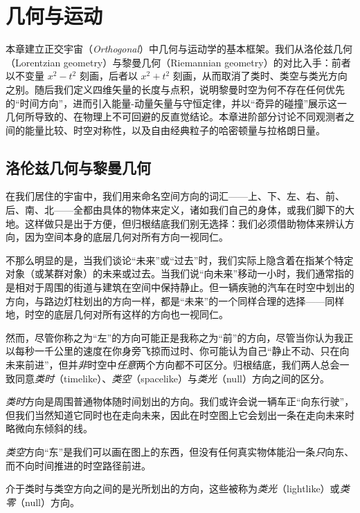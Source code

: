 \chapter{几何与运动}

本章建立正交宇宙（\emph{Orthogonal}）中几何与运动学的基本框架。我们从洛伦兹几何（Lorentzian geometry）与黎曼几何（Riemannian geometry）的对比入手：前者以不变量 $x^{2}-t^{2}$ 刻画，后者以 $x^{2}+t^{2}$ 刻画，从而取消了类时、类空与类光方向之别。随后我们定义四维矢量的长度与点积，说明黎曼时空为何不存在任何优先的“时间方向”，进而引入能量-动量矢量与守恒定律，并以“奇异的碰撞”展示这一几何所导致的、在物理上不可回避的反直觉结论。本章进阶部分讨论不同观测者之间的能量比较、时空对称性，以及自由经典粒子的哈密顿量与拉格朗日量。

\section{洛伦兹几何与黎曼几何}

在我们居住的宇宙中，我们用来命名空间方向的词汇——上、下、左、右、前、后、南、北——全都由具体的物体来定义，诸如我们自己的身体，或我们脚下的大地。这样做只是出于方便，但归根结底我们别无选择：我们必须借助物体来辨认方向，因为空间本身的底层几何对所有方向一视同仁。

不那么明显的是，当我们谈论“未来”或“过去”时，我们实际上隐含着在指某个特定对象（或某群对象）的未来或过去。当我们说“向未来”移动一小时，我们通常指的是相对于周围的街道与建筑在空间中保持静止。但一辆疾驰的汽车在时空中划出的方向，与路边灯柱划出的方向一样，都是“未来”的一个同样合理的选择——同样地，时空的底层几何对所有这样的方向也一视同仁。


然而，尽管你称之为“左”的方向可能正是我称之为“前”的方向，尽管当你认为我正以每秒一千公里的速度在你身旁飞掠而过时、你可能认为自己“静止不动、只在向未来前进”，但并\emph{非}时空中\emph{任意}两个方向都不可区分。归根结底，我们两人总会一致同意\emph{类时}（timelike）、\emph{类空}（spacelike）与\emph{类光}（null）方向之间的区分。

\emph{类时}方向是周围普通物体随时间划出的方向。我们或许会说一辆车正“向东行驶”，但我们当然知道它同时也在走向未来，因此在时空图上它会划出一条在走向未来时略微向东倾斜的线。

\emph{类空}方向“东”是我们可以画在图上的东西，但没有任何真实物体能沿一条\emph{只}向东、而不向时间推进的时空路径前进。

介于类时与类空方向之间的是光所划出的方向，这些被称为\emph{类光}（lightlike）或\emph{类零}（null）方向。

